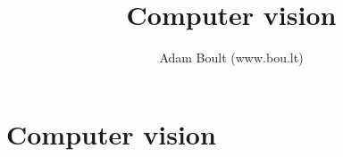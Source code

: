\documentclass[oneside]{book}
\begin{document}
\author{Adam Boult (www.bou.lt)}
\title{Computer vision}
\maketitle

\setcounter{tocdepth}{0}
\tableofcontents



\part{Computer vision}




\end{document}
